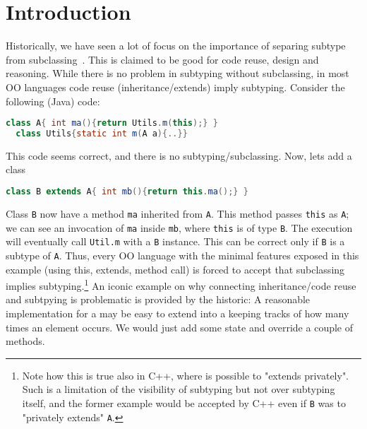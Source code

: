 \section{Introduction}

Historically, we have seen a lot of focus on the importance of
separing subtype from subclassing~\cite{cook}.  This is claimed to be
good for code reuse, design and reasoning.  While there is no problem
in subtyping without subclassing, in most OO languages code reuse
(inheritance/extends) imply subtyping.  Consider the following (Java)
code:

\begin{lstlisting}[language=Java]
  class A{ int ma(){return Utils.m(this);} }
  class Utils{static int m(A a){..}}
\end{lstlisting}

This code seems correct, and there is no subtyping/subclassing.
Now, lets add a class \Q@B@

\begin{lstlisting}[language=Java]
  class B extends A{ int mb(){return this.ma();} }
\end{lstlisting}

Class \lstinline{B} now have a method \lstinline{ma} inherited from \lstinline{A}.
This method passes \lstinline{this} as \lstinline{A}; we can see an invocation of \lstinline{ma}
inside \lstinline{mb}, where \lstinline{this} is of type \lstinline{B}.
The execution will eventually call \lstinline{Util.m} with a \lstinline{B} instance.
This can be correct only if \lstinline{B} is a subtype of \lstinline{A}.
Thus, every OO language with the minimal features 
exposed in this example (using this, extends, method call)
is forced to accept that subclassing implies subtyping.\footnote{
Note how this is true also in C++, where is possible to
"extends privately". Such is a limitation of the visibility of
subtyping but not over subtyping itself, and the former example
would be accepted by C++ even if \lstinline{B} was to "privately extends" \lstinline{A}.}
An iconic example on why connecting inheritance/code reuse and subtpying is problematic is
provided by the historic\cite{LaLonde:1991:SSS:110673.110679}:
A reasonable implementation for a \Q@Set@ may be easy to extend into a \Q@Bag@ keeping tracks of how many times an element occurs.
We would just add some state and override a couple of methods.

